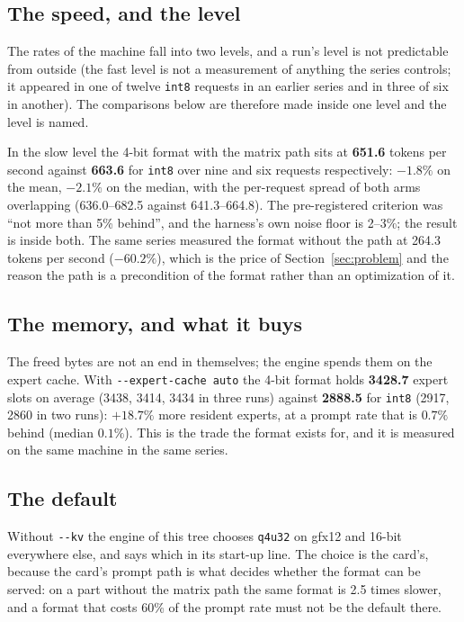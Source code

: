 \documentclass[10pt,twocolumn]{article}
\begin{document}
\subsection{The speed, and the level}

The rates of the machine fall into two levels, and a run's level is not predictable from outside (the fast
level is not a measurement of anything the series controls; it appeared in one of twelve \texttt{int8}
requests in an earlier series and in three of six in another). The comparisons below are therefore made
inside one level and the level is named.

In the slow level the 4-bit format with the matrix path sits at \textbf{651.6} tokens per second against
\textbf{663.6} for \texttt{int8} over nine and six requests respectively: $-1.8\%$ on the mean, $-2.1\%$ on
the median, with the per-request spread of both arms overlapping (636.0--682.5 against 641.3--664.8). The
pre-registered criterion was ``not more than 5\% behind'', and the harness's own noise floor is 2--3\%; the
result is inside both. The same series measured the format without the path at 264.3 tokens per second
($-60.2\%$), which is the price of Section~\ref{sec:problem} and the reason the path is a precondition of
the format rather than an optimization of it.

\subsection{The memory, and what it buys}

The freed bytes are not an end in themselves; the engine spends them on the expert cache. With
\texttt{-{}-expert-cache auto} the 4-bit format holds \textbf{3428.7} expert slots on average (3438, 3414,
3434 in three runs) against \textbf{2888.5} for \texttt{int8} (2917, 2860 in two runs): \textbf{$+18.7\%$}
more resident experts, at a prompt rate that is $0.7\%$ behind (median $0.1\%$). This is the trade the
format exists for, and it is measured on the same machine in the same series.

\subsection{The default}

Without \texttt{-{}-kv} the engine of this tree chooses \texttt{q4u32} on gfx12 and 16-bit everywhere else,
and says which in its start-up line. The choice is the card's, because the card's prompt path is what
decides whether the format can be served: on a part without the matrix path the same format is 2.5 times
slower, and a format that costs 60\% of the prompt rate must not be the default there.
\end{document}
